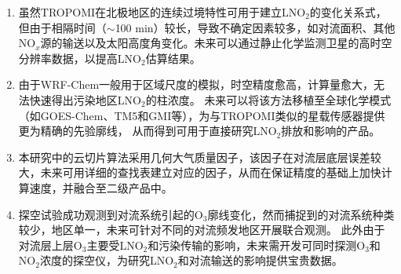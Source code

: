 \begin{enumerate}[label=（\arabic*）, labelindent=\parindent, nosep, leftmargin=0pt, widest=0, itemindent=*, topsep=0pt, partopsep=0pt, parsep=0pt]

\item 虽然TROPOMI在北极地区的连续过境特性可用于建立LNO$_2$的变化关系式，但由于相隔时间（$\sim$100 min）较长，导致不确定因素较多，如对流面积、其他NO$_x$源的输送以及太阳高度角变化。未来可以通过静止化学监测卫星的高时空分辨率数据，以提高LNO$_2$估算结果。

\item 由于WRF-Chem一般用于区域尺度的模拟，时空精度愈高，计算量愈大，无法快速得出污染地区LNO$_2$的柱浓度。
未来可以将该方法移植至全球化学模式（如GOES-Chem、TM5和GMI等），为与TROPOMI类似的星载传感器提供更为精确的先验廓线，
从而得到可用于直接研究LNO$_2$排放和影响的产品。

\item 本研究中的云切片算法采用几何大气质量因子，该因子在对流层底层误差较大，未来可用详细的查找表建立对应的因子，从而在保证精度的基础上加快计算速度，并融合至二级产品中。

\item 探空试验成功观测到对流系统引起的O$_3$廓线变化，然而捕捉到的对流系统种类较少，地区单一，未来可针对不同的对流频发地区开展联合观测。
此外由于对流层上层O$_3$主要受LNO$_2$和污染传输的影响，未来需开发可同时探测O$_3$和NO$_2$浓度的探空仪，为研究LNO$_2$和对流输送的影响提供宝贵数据。

\end{enumerate}
